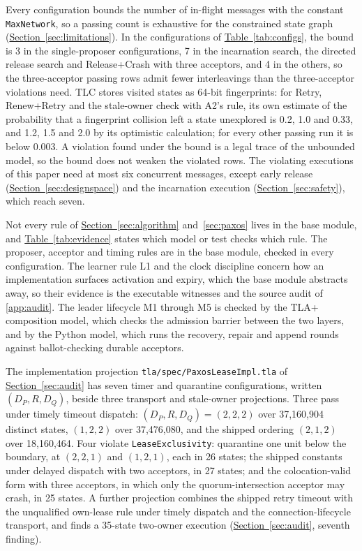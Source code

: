 \documentclass[final,5p,times,twocolumn,number]{elsarticle}
\newcommand{\code}[1]{\texttt{#1}}
\newcommand{\secref}[1]{\hyperref[#1]{Section~\ref*{#1}}}
\newcommand{\tabref}[1]{\hyperref[#1]{Table~\ref*{#1}}}
\begin{document}
Every configuration bounds the number of in-flight messages with the constant \code{MaxNetwork}, so a passing count is exhaustive for the constrained state graph (\secref{sec:limitations}).  In the configurations of \tabref{tab:configs}, the bound is 3 in the single-proposer configurations, 7 in the incarnation search, the directed release search and Release+Crash with three acceptors, and 4 in the others, so the three-acceptor passing rows admit fewer interleavings than the three-acceptor violations need.  TLC stores visited states as 64-bit fingerprints: for Retry, Renew+Retry and the stale-owner check with A2's rule, its own estimate of the probability that a fingerprint collision left a state unexplored is 0.2, 1.0 and 0.33, and 1.2, 1.5 and 2.0 by its optimistic calculation; for every other passing run it is below 0.003.  A violation found under the bound is a legal trace of the unbounded model, so the bound does not weaken the violated rows.  The violating executions of this paper need at most six concurrent messages, except early release (\secref{sec:designspace}) and the incarnation execution (\secref{sec:safety}), which reach seven.

Not every rule of \secref{sec:algorithm} and~\ref{sec:paxos} lives in the base module, and \tabref{tab:evidence} states which model or test checks which rule.  The proposer, acceptor and timing rules are in the base module, checked in every configuration.  The learner rule L1 and the clock discipline concern how an implementation surfaces activation and expiry, which the base module abstracts away, so their evidence is the executable witnesses and the source audit of \ref{app:audit}.  The leader lifecycle M1 through M5 is checked by the TLA+ composition model, which checks the admission barrier between the two layers, and by the Python model, which runs the recovery, repair and append rounds against ballot-checking durable acceptors.

The implementation projection \code{tla/spec/PaxosLeaseImpl.tla} of \secref{sec:audit} has seven timer and quarantine configurations, written $(D_P, R, D_Q)$, beside three transport and stale-owner projections.  Three pass under timely timeout dispatch: $(D_P, R, D_Q) = (2,2,2)$ over 37{,}160{,}904 distinct states, $(1,2,2)$ over 37{,}476{,}080, and the shipped ordering $(2,1,2)$ over 18{,}160{,}464.  Four violate \code{LeaseExclusivity}: quarantine one unit below the boundary, at $(2,2,1)$ and $(1,2,1)$, each in 26 states; the shipped constants under delayed dispatch with two acceptors, in 27 states; and the colocation-valid form with three acceptors, in which only the quorum-intersection acceptor may crash, in 25 states.  A further projection combines the shipped retry timeout with the unqualified own-lease rule under timely dispatch and the connection-lifecycle transport, and finds a 35-state two-owner execution (\secref{sec:audit}, seventh finding).
\end{document}
